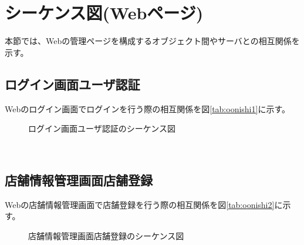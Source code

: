 \documentclass[a4j]{jarticle}
\begin{document}
\section{シーケンス図(Webページ)}
本節では、Webの管理ページを構成するオブジェクト間やサーバとの相互関係を示す。

\subsection{ログイン画面ユーザ認証}
Webのログイン画面でログインを行う際の相互関係を図\ref {tab:oonishi1}に示す。
\begin{figure}[hb]
\begin{center}
\caption{ログイン画面ユーザ認証のシーケンス図}
\label{oonishi1}
\end{center}
\end{figure}　　
\subsection{店舗情報管理画面店舗登録}
Webの店舗情報管理画面で店舗登録を行う際の相互関係を図\ref {tab:oonishi2}に示す。
\begin{figure}[hb]
\begin{center}
\caption{店舗情報管理画面店舗登録のシーケンス図}
\label{oonishi2}
\end{center}
\end{figure}
\end{document}
